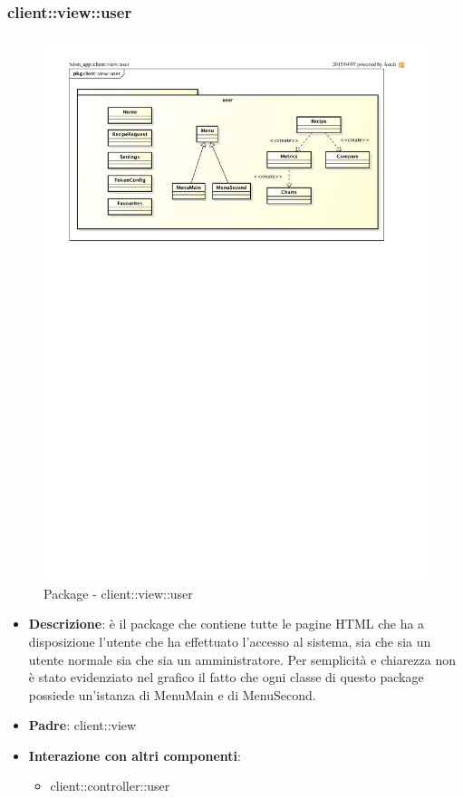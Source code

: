 \subsubsection{client::view::user} %
\label{ssub:bdsm_app_client_view_user}
\begin{figure}[htbp]
	\centering
	\centerline{\includegraphics[scale=0.95]{./images/client/client_view_user.pdf}}
	\caption{Package - client::view::user}
\end{figure}

\begin{itemize}
	\item \textbf{Descrizione}: è il package che contiene tutte le pagine HTML che ha a disposizione l'utente che ha effettuato l'accesso al sistema, sia che sia un utente normale sia che sia un amministratore. \newline
	Per semplicità e chiarezza non è stato evidenziato nel grafico il fatto che ogni classe di questo package possiede un'istanza di MenuMain e di MenuSecond.
	\item \textbf{Padre}: client::view
	\item \textbf{Interazione con altri componenti}:
		\begin{itemize}
			\item client::controller::user
		\end{itemize}
\end{itemize}

